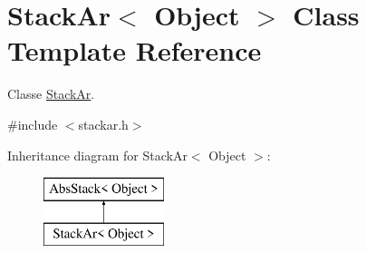 \hypertarget{class_stack_ar}{}\section{Stack\+Ar$<$ Object $>$ Class Template Reference}
\label{class_stack_ar}


Classe \hyperlink{class_stack_ar}{Stack\+Ar}.  




{\ttfamily \#include $<$stackar.\+h$>$}

Inheritance diagram for Stack\+Ar$<$ Object $>$\+:\begin{figure}[H]
\begin{center}
\leavevmode
\includegraphics[height=2.000000cm]{class_stack_ar}
\end{center}
\end{figure}
